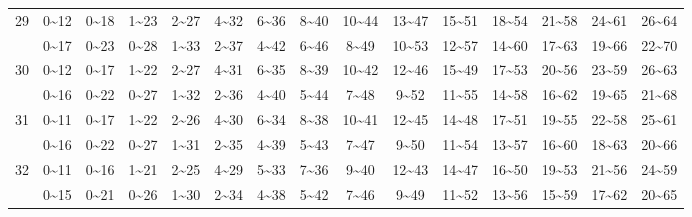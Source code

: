 \documentclass[lang=cn,10pt]{elegantbook}
\begin{document}
\begin{longtable}{c|cccccccccccccc}
    29 & 0\textasciitilde12 & 0\textasciitilde18 & 1\textasciitilde23 & 2\textasciitilde27 & 4\textasciitilde32 & 6\textasciitilde36 & 8\textasciitilde40 & 10\textasciitilde44 & 13\textasciitilde47 & 15\textasciitilde51 & 18\textasciitilde54 & 21\textasciitilde58 & 24\textasciitilde61 & 26\textasciitilde64 \\
       & 0\textasciitilde17 & 0\textasciitilde23 & 0\textasciitilde28 & 1\textasciitilde33 & 2\textasciitilde37 & 4\textasciitilde42 & 6\textasciitilde46 & 8\textasciitilde49 & 10\textasciitilde53 & 12\textasciitilde57 & 14\textasciitilde60 & 17\textasciitilde63 & 19\textasciitilde66 & 22\textasciitilde70 \\
    30 & 0\textasciitilde12 & 0\textasciitilde17 & 1\textasciitilde22 & 2\textasciitilde27 & 4\textasciitilde31 & 6\textasciitilde35 & 8\textasciitilde39 & 10\textasciitilde42 & 12\textasciitilde46 & 15\textasciitilde49 & 17\textasciitilde53 & 20\textasciitilde56 & 23\textasciitilde59 & 26\textasciitilde63 \\
       & 0\textasciitilde16 & 0\textasciitilde22 & 0\textasciitilde27 & 1\textasciitilde32 & 2\textasciitilde36 & 4\textasciitilde40 & 5\textasciitilde44 & 7\textasciitilde48 & 9\textasciitilde52 & 11\textasciitilde55 & 14\textasciitilde58 & 16\textasciitilde62 & 19\textasciitilde65 & 21\textasciitilde68 \\
    31 & 0\textasciitilde11 & 0\textasciitilde17 & 1\textasciitilde22 & 2\textasciitilde26 & 4\textasciitilde30 & 6\textasciitilde34 & 8\textasciitilde38 & 10\textasciitilde41 & 12\textasciitilde45 & 14\textasciitilde48 & 17\textasciitilde51 & 19\textasciitilde55 & 22\textasciitilde58 & 25\textasciitilde61 \\
       & 0\textasciitilde16 & 0\textasciitilde22 & 0\textasciitilde27 & 1\textasciitilde31 & 2\textasciitilde35 & 4\textasciitilde39 & 5\textasciitilde43 & 7\textasciitilde47 & 9\textasciitilde50 & 11\textasciitilde54 & 13\textasciitilde57 & 16\textasciitilde60 & 18\textasciitilde63 & 20\textasciitilde66 \\
    32 & 0\textasciitilde11 & 0\textasciitilde16 & 1\textasciitilde21 & 2\textasciitilde25 & 4\textasciitilde29 & 5\textasciitilde33 & 7\textasciitilde36 & 9\textasciitilde40 & 12\textasciitilde43 & 14\textasciitilde47 & 16\textasciitilde50 & 19\textasciitilde53 & 21\textasciitilde56 & 24\textasciitilde59 \\
       & 0\textasciitilde15 & 0\textasciitilde21 & 0\textasciitilde26 & 1\textasciitilde30 & 2\textasciitilde34 & 4\textasciitilde38 & 5\textasciitilde42 & 7\textasciitilde46 & 9\textasciitilde49 & 11\textasciitilde52 & 13\textasciitilde56 & 15\textasciitilde59 & 17\textasciitilde62 & 20\textasciitilde65 \\

\end{longtable}
\end{document}
